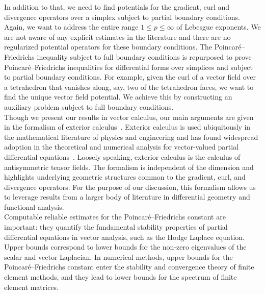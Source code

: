 \documentclass[12pt,a4paper]{article}
\begin{document}
In addition to that, we need to find potentials for the gradient, curl and divergence operators over a simplex subject to partial boundary conditions. 
Again, we want to address the entire range $1 \leq p \leq \infty$ of Lebesgue exponents. 
We are not aware of any explicit estimates in the literature and there are no regularized potential operators for these boundary conditions. 
The Poincar\'e--Friedrichs inequality subject to full boundary conditions is repurposed to prove Poincar\'e--Friedrichs inequalities for differential forms over simplices and subject to partial boundary conditions. 
For example, given the curl of a vector field over a tetrahedron that vanishes along, say, two of the tetrahedron faces, we want to find the unique vector field potential. We achieve this by constructing an auxiliary problem subject to full boundary conditions.
\\



Though we present our results in vector calculus, our main arguments are given in the formalism of exterior calculus~\cite{greub1967multilinear,lee2012smooth}. Exterior calculus is used ubiquitously in the mathematical literature of physics and engineering and has found widespread adoption in the theoretical and numerical analysis for vector-valued partial differential equations~\cite{hiptmair2002finite,gross2004electromagnetic,arnold2006finite,arnold2009geometric,arnold2010finite,demlow2014posteriori,licht2021local,arnold2021complexes}. Loosely speaking, exterior calculus is the calculus of antisymmetric tensor fields. The formalism is independent of the dimension and highlights underlying geometric structures common to the gradient, curl, and divergence operators.
For the purpose of our discussion, this formalism allows us to leverage results from a larger body of literature in differential geometry and functional analysis. 
\\ 




Computable reliable estimates for the Poincar\'e--Friedrichs constant are important: 
they quantify the fundamental stability properties of partial differential equations in vector analysis,
such as the Hodge Laplace equation. 
Upper bounds correspond to lower bounds for the non-zero eigenvalues of the scalar and vector Laplacian.
In numerical methods, upper bounds for the Poincar\'e--Friedrichs constant enter the stability and convergence theory of finite element methods,
and they lead to lower bounds for the spectrum of finite element matrices. 
\end{document}
